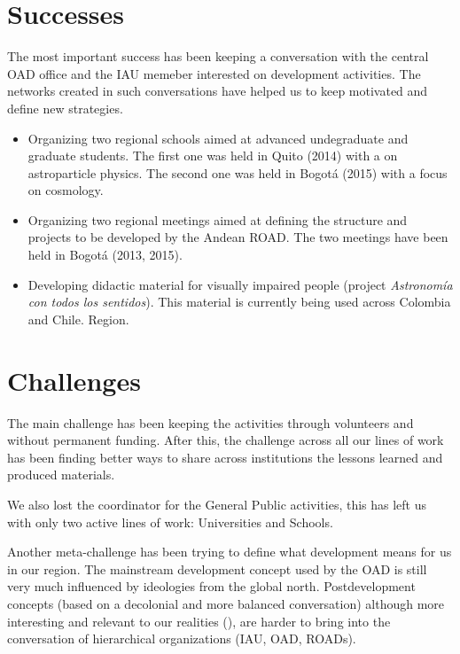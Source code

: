 \documentclass{iau}
\begin{document}
\section{Successes}

The most important success has been keeping a conversation with the
central OAD office and the IAU memeber interested on development
activities. 
The networks created in such conversations have helped us to keep
motivated and define new strategies.
\begin{itemize}
\item Organizing two regional schools aimed at advanced undegraduate
  and graduate students. The first one was held in Quito (2014) with a
  on astroparticle physics. The second one was held in Bogot\'a (2015)
  with a focus on cosmology.
\item Organizing two regional meetings aimed at defining the structure
  and projects to be developed by the Andean ROAD. The two meetings
  have been held in Bogot\'a (2013, 2015). 
\item Developing didactic material for visually impaired people
(project \emph{Astronom\'ia con todos los sentidos}). This
  material is currently being used across Colombia and Chile.
  Region.
\end{itemize}



\section{Challenges}

The main challenge has been keeping the activities through volunteers
and without permanent funding. 
After this, the challenge across all our lines of work has been
finding better ways to share across institutions the lessons learned
and produced materials. 

We also lost the coordinator for the General Public activities, this
has left us with only two active lines of work: Universities and
Schools. 

Another meta-challenge has been trying to define what development means for
us in our region. 
The mainstream development concept used by the OAD is still very much
influenced by ideologies from the global north.
Postdevelopment concepts (based on a decolonial and more balanced
conversation) although more interesting and relevant to our realities
(\cite{Grosfoguel02}), are harder to bring into the conversation of
hierarchical organizations (IAU, OAD, ROADs).  
\end{document}
